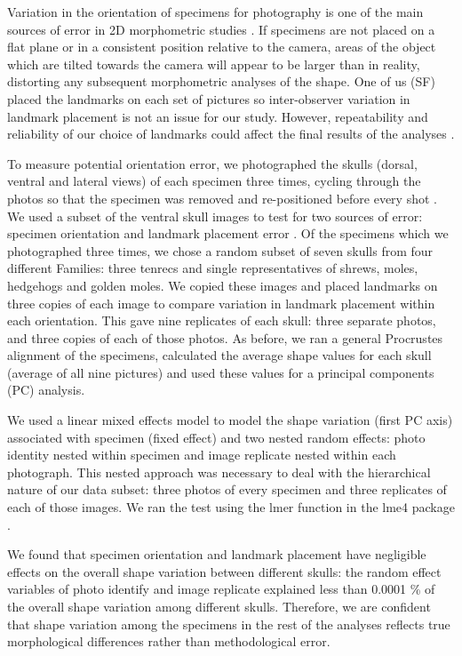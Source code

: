 \documentclass[12pt,a4paper]{article}
\begin{document}
    Variation in the orientation of specimens for photography is one of the main sources of error in 2D morphometric studies \citep{Adriaens2007}. If specimens are not placed on a flat plane or in a consistent position relative to the camera, areas of the object which are tilted towards the camera will appear to be larger than in reality, distorting any subsequent morphometric analyses of the shape. 
	One of us (SF) placed the landmarks on each set of pictures so inter-observer variation in landmark placement is not an issue for our study.  However, repeatability and reliability of our choice of landmarks could affect the final results of the analyses \citep{Arnqvist1998}.

	
	To measure potential orientation error, we photographed the skulls (dorsal, ventral and lateral views) of each specimen three times, cycling through the photos so that the specimen was removed and re-positioned before every shot \citep{Viscosi2011}.
	We used a subset of the ventral skull images to test for two sources of error: specimen orientation and landmark placement error \citep{Arnqvist1998, Barrow2008}. Of the specimens which we photographed three times, we chose a random subset of seven skulls from four different Families: three tenrecs and single representatives of shrews, moles, hedgehogs and golden moles. We copied these images and placed landmarks on three copies of each image to compare variation in landmark placement within each orientation. This gave nine replicates of each skull: three separate photos, and three copies of each of those photos. As before, we ran a general Procrustes alignment \citep{Rohlf1993} of the specimens, calculated the average shape values for each skull (average of all nine pictures) and used these values for a principal components (PC) analysis.
		
	We used a linear mixed effects model to model the shape variation (first PC axis) associated with specimen (fixed effect) and two nested random effects: photo identity nested within specimen and image replicate nested within each photograph. This nested approach was necessary to deal with the hierarchical nature of our data subset: three photos of every specimen and three replicates of each of those images. We ran the test using the lmer function in the lme4 package \citep{Bates2014}.  

	We found that specimen orientation and landmark placement have negligible effects on the overall shape variation between different skulls: the random effect variables of photo identify and image replicate explained less than 0.0001 \% of the overall shape variation among different skulls. Therefore, we are confident that shape variation among the specimens in the rest of the analyses reflects true morphological differences rather than methodological error.
\end{document}
